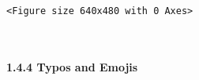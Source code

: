\documentclass[11pt]{article}
\begin{document}
    
    \begin{Verbatim}[commandchars=\\\{\}]
<Figure size 640x480 with 0 Axes>
    \end{Verbatim}

    
    \begin{center}
    \end{center}
    { \hspace*{\fill} \\}
    
    \paragraph{1.4.4 Typos and Emojis}\label{typos-and-emojis}
\end{document}
